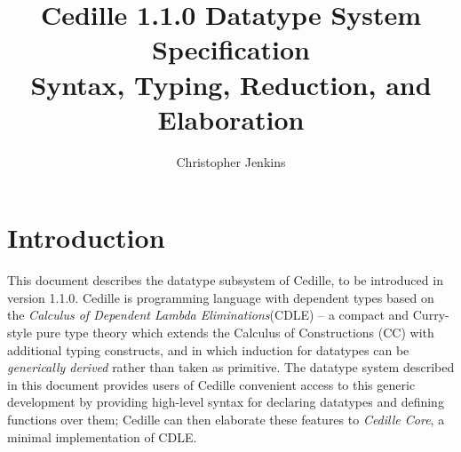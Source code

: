\documentclass{article}
\begin{document}
\title{Cedille 1.1.0 Datatype System Specification \\ \large Syntax, Typing, Reduction,
  and Elaboration }

\author{Christopher Jenkins}

\maketitle

\section{Introduction}
\label{sec:intro}
This document describes the datatype subsystem of Cedille, to be introduced in
version 1.1.0. Cedille is programming language with dependent types based on the
\textit{Calculus of Dependent Lambda Eliminations}(CDLE)\cite{St17_CDLE} -- a
compact and Curry-style pure type theory which extends the Calculus of
Constructions (CC)\cite{CH86_CC} with additional typing constructs, and in which
induction for datatypes can be \textit{generically
  derived}\cite{FBS18_Efficient-Mendler} rather than taken as primitive. The
datatype system described in this document provides users of Cedille convenient
access to this generic development by providing high-level syntax for declaring
datatypes and defining functions over them; Cedille can then elaborate these
features to \textit{Cedille Core}\cite{St18_Cedille-Core}, a minimal
implementation of CDLE.
\end{document}
